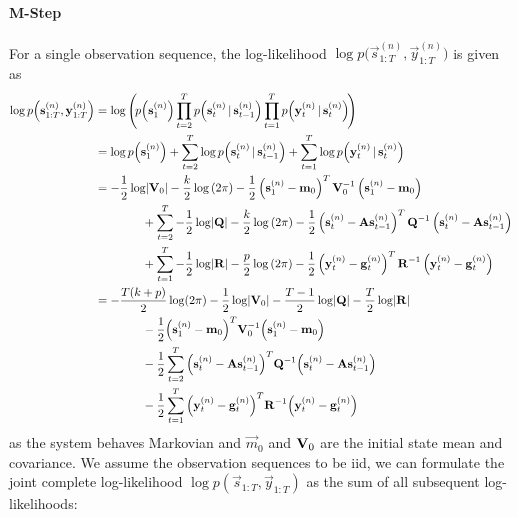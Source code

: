 	\paragraph{M-Step}
		For a single observation sequence, the log-likelihood \( \log p\Big(\vec{s}_{1:T}^{(n)}, \vec{y}_{1:T}^{(n)}\Big) \) is given as
		\begin{align*}
			\log p\Big(\vec{s}_{1:T}^{(n)}, \vec{y}_{1:T}^{(n)}\Big)
				&= \log \Bigg(\! p\Big(\vec{s}_1^{(n)}\Big) \prod_{t = 2}^{T} p\Big(\vec{s}_t^{(n)} \given \vec{s}_{t - 1}^{(n)}\Big) \prod_{t = 1}^{T} p\Big(\vec{y}_t^{(n)} \given \vec{s}_t^{(n)}\Big) \!\Bigg) \\
				&= \log p\Big(\vec{s}_1^{(n)}\Big) + \sum_{t = 2}^{T} \log p\Big(\vec{s}_t^{(n)} \given \vec{s}_{t - 1}^{(n)}\Big) + \sum_{t = 1}^{T} \log p\Big(\vec{y}_t^{(n)} \given \vec{s}_t^{(n)}\Big) \\
				&= \logGaussianMulti{\vec{s}_1^{(n)}}{\vec{m}_0}{\mat{V}_0}{k} \\
				&\qquad\qquad + \sum_{t = 2}^{T} \logGaussianMulti{\vec{s}_t^{(n)}}{\mat{A} \vec{s}_{t - 1}^{(n)}}{\mat{Q}}{k} \\
				&\qquad\qquad + \sum_{t = 1}^{T} \logGaussianMulti{\vec{y}_t^{(n)}}{\vec{g}_t^{(n)}}{\mat{R}}{p} \\
				&= -\frac{T(k + p)}{2} \log(2\pi) - \frac{1}{2} \log \lvert \mat{V}_0 \rvert - \frac{T - 1}{2} \log \lvert \mat{Q} \rvert - \frac{T}{2} \log \lvert \mat{R} \rvert \\
				&\qquad\qquad -\frac{1}{2} \Big( \vec{s}_1^{(n)} - \vec{m}_0 \Big)^T \mat{V}_0^{-1} \Big( \vec{s}_1^{(n)} - \vec{m}_0 \Big) \\
				&\qquad\qquad -\frac{1}{2} \sum_{t = 2}^{T} \Big( \vec{s}_t^{(n)} - \mat{A} \vec{s}_{t - 1}^{(n)} \Big)^T \mat{Q}^{-1} \Big( \vec{s}_t^{(n)} - \mat{A} \vec{s}_{t - 1}^{(n)} \Big) \\
				&\qquad\qquad -\frac{1}{2} \sum_{t = 1}^{T} \Big( \vec{y}_t^{(n)} - \vec{g}_t^{(n)} \Big)^T \mat{R}^{-1} \Big( \vec{y}_t^{(n)} - \vec{g}_t^{(n)} \Big)
		\end{align*}
		as the system behaves Markovian and \( \vec{m}_0 \) and \( \mat{V}_0 \) are the initial state mean and covariance. We assume the observation sequences to be \ac{iid}, we can formulate the joint complete log-likelihood \( \log p(\vec{s}_{1:T}, \vec{y}_{1:T}) \) as the sum of all subsequent log-likelihoods:
